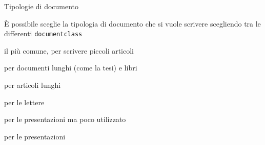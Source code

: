 \begin{frame}{Tipologie di documento}

È possibile sceglie la tipologia di documento che si vuole scrivere scegliendo 
tra le differenti \texttt{documentclass} 

\begin{description}
	\item <2->[\textbf{article}] il più comune, per scrivere piccoli articoli
	\item <3->[\textbf{book}] per documenti lunghi (come la tesi) e libri
	\item <4->[\textbf{report}] per articoli lunghi
	\item <5->[\textbf{letter}] per le lettere
	\item <6->[\textbf{slide}] per le presentazioni ma poco utilizzato
	\item <7->[\textbf{beamer}] per le presentazioni
\end{description}

\end{frame}